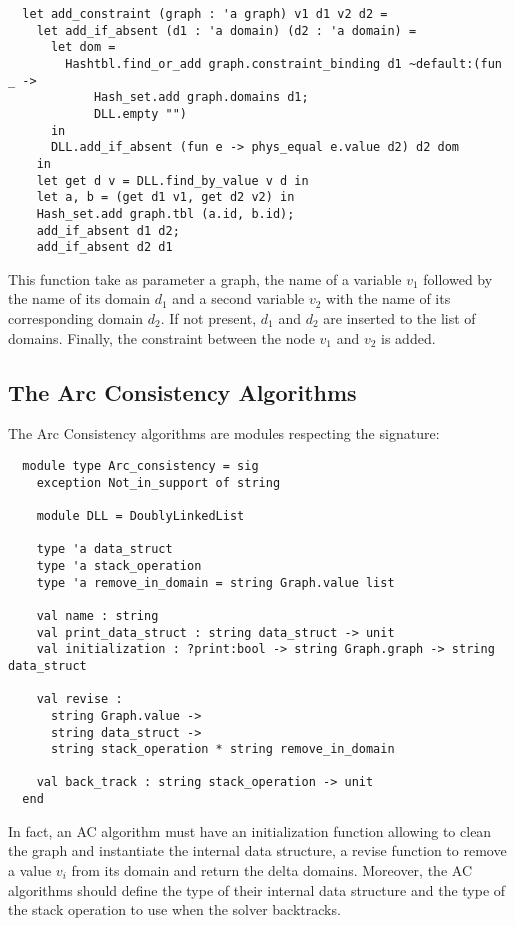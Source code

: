 \documentclass{rapport}
\begin{document}
\begin{verbatim}
  let add_constraint (graph : 'a graph) v1 d1 v2 d2 =
    let add_if_absent (d1 : 'a domain) (d2 : 'a domain) =
      let dom =
        Hashtbl.find_or_add graph.constraint_binding d1 ~default:(fun _ ->
            Hash_set.add graph.domains d1;
            DLL.empty "")
      in
      DLL.add_if_absent (fun e -> phys_equal e.value d2) d2 dom
    in
    let get d v = DLL.find_by_value v d in
    let a, b = (get d1 v1, get d2 v2) in
    Hash_set.add graph.tbl (a.id, b.id);
    add_if_absent d1 d2;
    add_if_absent d2 d1
\end{verbatim}

This function take as parameter a graph, the name of a variable $v_1$ followed by the name of its domain $d_1$ and a second variable $v_2$ with the name of its corresponding domain $d_2$. If not present, $d_1$ and $d_2$ are inserted to the list of domains. Finally, the constraint between the node $v_1$ and $v_2$ is added.


\subsection{The Arc Consistency Algorithms}
The Arc Consistency algorithms are modules respecting the signature:

\begin{verbatim}
  module type Arc_consistency = sig
    exception Not_in_support of string

    module DLL = DoublyLinkedList

    type 'a data_struct
    type 'a stack_operation
    type 'a remove_in_domain = string Graph.value list

    val name : string
    val print_data_struct : string data_struct -> unit
    val initialization : ?print:bool -> string Graph.graph -> string data_struct

    val revise :
      string Graph.value ->
      string data_struct ->
      string stack_operation * string remove_in_domain

    val back_track : string stack_operation -> unit
  end
\end{verbatim}

In fact, an AC algorithm must have an initialization function allowing to clean the graph and instantiate the internal data structure, a revise function to remove a value $v_i$ from its domain and return the delta domains. Moreover, the AC algorithms should define the type of their internal data structure and the type of the stack operation to use when the solver backtracks.
\end{document}
